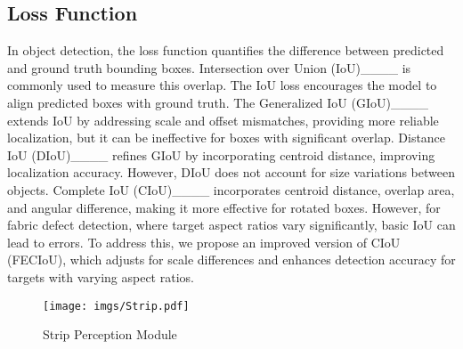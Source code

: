 \subsection{Loss Function}
In object detection, the loss function quantifies the difference between predicted and ground truth bounding boxes. Intersection over Union (IoU)____ is commonly used to measure this overlap. The IoU loss encourages the model to align predicted boxes with ground truth. The Generalized IoU (GIoU)____ extends IoU by addressing scale and offset mismatches, providing more reliable localization, but it can be ineffective for boxes with significant overlap.
Distance IoU (DIoU)____ refines GIoU by incorporating centroid distance, improving localization accuracy. However, DIoU does not account for size variations between objects. Complete IoU (CIoU)____ incorporates centroid distance, overlap area, and angular difference, making it more effective for rotated boxes. However, for fabric defect detection, where target aspect ratios vary significantly, basic IoU can lead to errors. To address this, we propose an improved version of CIoU (FECIoU), which adjusts for scale differences and enhances detection accuracy for targets with varying aspect ratios.


\begin{figure*}[t]
    \centering
    \texttt{[image: imgs/Strip.pdf]}
    \caption{Strip Perception Module}
\label{fig2}
\end{figure*}